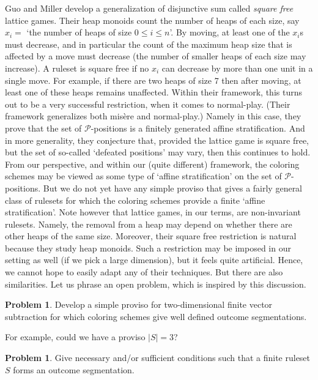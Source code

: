 \documentclass{amsart}
\theoremstyle{plain}
\theoremstyle{definition}
\newtheorem{problem}[thm]{Problem}
\renewcommand{\P}{\ensuremath{\mathcal P}}
\renewcommand{\le}{\leqslant}
\begin{document}
Guo and Miller \cite{guo2011lattice} develop a generalization of disjunctive sum called {\em square free} lattice games. Their heap monoids count the number of heaps of each size, say $x_i=$ `the number of heaps of size $0\le i\le n$'. By moving, at least one of the $x_i$s must decrease, and in particular the count of the maximum heap size that is affected by a move must decrease (the number of smaller heaps of each size may increase). A ruleset is square free if no $x_i$ can decrease by more than one unit in a single move. For example, if there are two heaps of size 7 then after moving, at least one of these heaps remains unaffected. 
Within their framework, this turns out to be a very successful restriction, when it comes to normal-play. (Their framework generalizes both mis\`ere and normal-play.) Namely in this case, they prove that the set of \P-positions is a finitely generated affine stratification. And in more generality, they conjecture that, provided the lattice game is square free, but the set of so-called `defeated positions' may vary, then this continues to hold. From our perspective, and within our (quite different) framework, the coloring schemes may be viewed as some type of `affine stratification' on the set of \P-positions. But we do not yet have any simple proviso that gives a fairly general class of rulesets for which the coloring schemes provide a finite `affine stratification'. Note however that lattice games, in our terms, are non-invariant rulesets. Namely, the removal from a heap may depend on whether there are other heaps of the same size. Moreover, their square free restriction is natural because they study heap monoids. Such a restriction may be imposed in our setting as well (if we pick a large dimension), but it feels quite artificial. Hence, we cannot hope to easily adapt any of their techniques. But there are also similarities. Let us phrase an open problem, which is inspired by this discussion. 


\begin{problem}
\label{prob:proviso}
    Develop a simple proviso for {\sc two-dimensional finite vector subtraction} for which coloring schemes give well defined outcome segmentations.
\end{problem}
For example, could we have a proviso $|S|=3$?

\begin{problem}
\label{prob:OS}
Give necessary and/or sufficient conditions such that a finite ruleset $S$ forms an outcome segmentation.
\end{problem}
\end{document}
